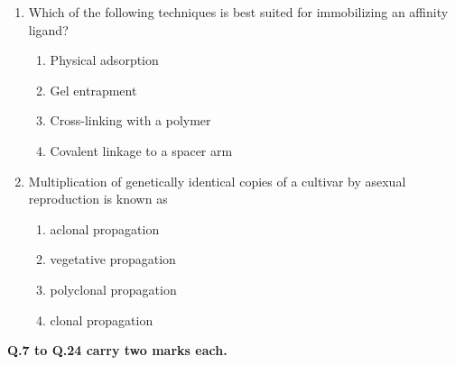 \documentclass[journal,12pt,onecolumn]{IEEEtran}
\begin{document}
\begin{enumerate}
\item Which of the following techniques is best suited for immobilizing an affinity ligand?
\begin{multicols}{2}
\begin{enumerate}[label=(\Alph*)]
    \item Physical adsorption
    \item Gel entrapment
    \item Cross-linking with a polymer
    \item Covalent linkage to a spacer arm
\end{enumerate}
\end{multicols}

\item Multiplication of genetically identical copies of a cultivar by asexual reproduction is known as
\begin{multicols}{2}
\begin{enumerate}[label=(\Alph*)]
    \item aclonal propagation
    \item vegetative propagation
    \item polyclonal propagation
    \item clonal propagation
\end{enumerate}
\end{multicols}
\end{enumerate}

\noindent\textbf{Q.7 to Q.24 carry two marks each.}
\end{document}

